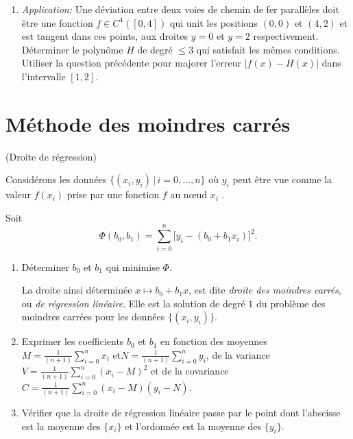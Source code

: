 \documentclass[a4paper,12pt,reqno]{amsart}
\begin{document}
\begin{exo}
\begin{enumerate}
    \item \textit{Application:} Une déviation entre deux voies de chemin de fer parallèles doit être une fonction $f \in C^{4}\left([0,4]\right)$ qui unit les positions $(0,0)$ et $(4,2)$ et est tangent dans ces points, aux droites $y=0$ et $y=2$ respectivement. Déterminer le polynôme $H$ de degré $\leq 3$ qui satisfait les mêmes conditions. Utiliser la question précédente pour majorer l'erreur $|f(x)-H(x)|$ dans l'intervalle $[1,2]$.

  \end{enumerate}
\end{exo}

\section{Méthode des moindres carrés}


\begin{exo} (Droite de régression)

  Considérons les données $\{(x_{i} ,y_{i}) \,|\, i = 0,\ldots,n\}$ où $y_{i}$ peut être vue comme la valeur $f(x_{i})$ prise par une fonction $f$ au nœud $x_{i}$ .

  Soit
    $$
      \Phi(b_{0} ,b_{1}) =
        \sum_{i=0}^{n} \big[y_{i} - (b_{0} + b_{1} x_{i})\big]^{2}.
    $$

  \begin{enumerate}
    \item Déterminer $b_{0}$ et $b_{1}$ qui minimise $\Phi$.

    La droite ainsi déterminée $x \mapsto b_{0} + b_{1} x$, est dite \emph{droite des moindres carrés}, ou \emph{de régression linéaire}. Elle est la solution de degré $1$ du problème des moindres carrées pour les données $\{(x_{i} ,y_{i})\}$.

    \item Exprimer les coefficients $b_{0}$ et $b_{1}$ en fonction des moyennes $M = \frac1{(n+1)} \sum_{i=0}^{n} x_{i}$ et\newline $N = \frac1{(n+1)} \sum_{i=0}^{n} y_{i}$, de la variance $V = \frac1{(n+1)} \sum_{i=0}^{n} (x_{i}-M)^{2}$ et de la covariance\newline $C = \frac1{(n+1)} \sum_{i=0}^{n} (x_{i}-M)(y_{i}-N)$.
    \item  Vérifier que la droite de régression linéaire passe par le point dont l'abscisse est la moyenne des $\{x_{i}\}$ et l'ordonnée est la moyenne des $\{y_{i}\}$.
  \end{enumerate}


\end{exo}
\end{document}
